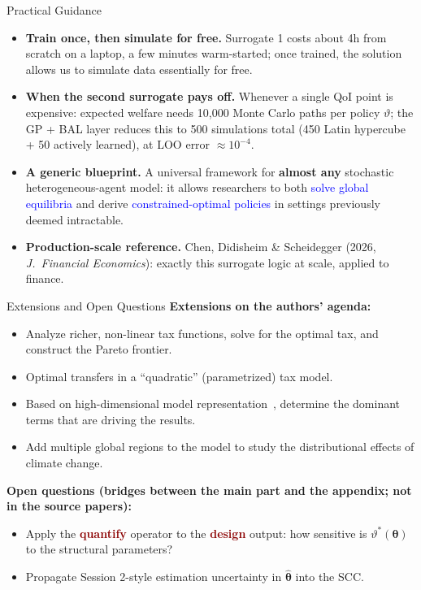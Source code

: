 \documentclass[10pt,aspectratio=169]{beamer}
\newcommand{\emphc}[1]{\textbf{\textcolor{darkred}{#1}}}
\begin{document}
\begin{frame}{Practical Guidance}
\small
\begin{itemize}\itemsep6pt
\item \textbf{Train once, then simulate for free.} Surrogate 1 costs about 4h from scratch on a laptop, a few minutes warm-started; once trained, the solution allows us to simulate data essentially for free.
\item \textbf{When the second surrogate pays off.} Whenever a single QoI point is expensive: expected welfare needs 10{,}000 Monte Carlo paths per policy $\vartheta$; the GP + BAL layer reduces this to 500 simulations total (450 Latin hypercube + 50 actively learned), at LOO error $\approx 10^{-4}$.
\item \textbf{A generic blueprint.} A universal framework for \textbf{almost any} stochastic heterogeneous-agent model: it allows researchers to both \textcolor{blue}{solve global equilibria} and derive \textcolor{blue}{constrained-optimal policies} in settings previously deemed intractable.
\item \textbf{Production-scale reference.} Chen, Didisheim \& Scheidegger (2026, \emph{J.\ Financial Economics}): exactly this surrogate logic at scale, applied to finance.
\end{itemize}
\end{frame}

\begin{frame}{Extensions and Open Questions}
\small
\textbf{Extensions on the authors' agenda:}
\begin{itemize}\itemsep2pt
\item Analyze richer, non-linear tax functions, solve for the optimal tax, and construct the Pareto frontier.
\item Optimal transfers in a ``quadratic'' (parametrized) tax model.
\item Based on high-dimensional model representation~\citep{eftekhari_2022}, determine the dominant terms that are driving the results.
\item Add multiple global regions to the model to study the distributional effects of climate change.
\end{itemize}
\vspace{0.5em}
\textbf{Open questions (bridges between the main part and the appendix; not in the source papers):}
\begin{itemize}\itemsep2pt
\item Apply the \emphc{quantify} operator to the \emphc{design} output: how sensitive is $\vartheta^*(\bm{\theta})$ to the structural parameters?
\item Propagate Session 2-style estimation uncertainty in $\hat{\bm{\theta}}$ into the SCC.
\end{itemize}
\end{frame}
\end{document}
